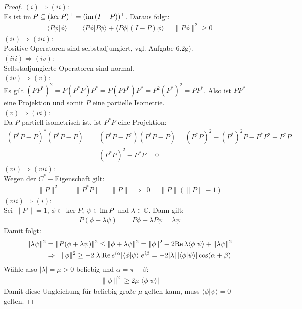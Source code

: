 \documentclass[a4paper,12pt]{article}
\newcommand{\brak}{}
\newcommand{\tecxt}{}
\begin{document}
\begin{proof}
$(i)\Rightarrow(ii)$:\\
Es ist im\,$P\subseteq (\ker P)^\bot=(\tecxt\text{im\,}(I-P))^\bot$. Daraus folgt:
\begin{align*}
\brak\langle {P\phi}| {\phi}\rangle&=\brak\langle {P\phi}| {P\phi}\rangle+\brak\langle {P\phi}| {(I-P)\phi}\rangle=\|P\phi\|^2\ge 0
\end{align*}
$(ii)\Rightarrow(iii)$:\\
Positive Operatoren sind selbstadjungiert, vgl. Aufgabe 6.2g).\\
$(iii)\Rightarrow(iv)$:\\
Selbstadjungierte Operatoren sind normal.\\
$(iv)\Rightarrow(v)$:\\
Es gilt $(PP^\ast)^2=P(P^\ast P)P^\ast =P(P P^\ast)P^\ast =P^2(P^\ast)^2=PP^\ast$. Also ist $PP^\ast$ eine Projektion und somit $P$ eine partielle Isometrie. \\
$(v)\Rightarrow(vi)$:\\
Da $P$ partiell isometrisch ist, ist $P^\ast P$ eine Projektion:
\begin{align*}
(P^\ast P-P)^\ast (P^\ast P-P)&=(P^\ast P-P^\ast)(P^\ast P-P)=(P^\ast P)^2-(P^\ast)^2P-P^\ast P^2+P^\ast P=\\
&=(P^\ast P)^2-P^\ast P=0
\end{align*}
$(vi)\Rightarrow(vii)$:\\
Wegen der $C^\ast -$Eigenschaft gilt:
\begin{align*}
\|P\|^2&=\|P^\ast P\|=\|P\|\ \ \Rightarrow\ \ 0=\|P\|(\|P\|-1)
\end{align*}
$(vii)\Rightarrow(i)$:\\
Sei $\|P\|=1$, $\phi\in\ker P$, $\psi\in\tecxt\text{im\,}P$ und $\lambda\in\mathbb{C}$. Dann gilt:
\begin{align*}
P(\phi+\lambda\psi)&=P\phi+\lambda P\psi=\lambda\psi
\end{align*}
Damit folgt:
\begin{align*}
\|\lambda\psi\|^2&=\|P(\phi+\lambda\psi)\|^2\le \|\phi+\lambda\psi\|^2=\|\phi\|^2+2\tecxt\text{Re\,}\lambda\brak\langle {\phi}| {\psi}\rangle+\|\lambda\psi\|^2\\
&\Rightarrow\ \ \|\phi\|^2\ge -2|\lambda|\tecxt\text{Re\,}e^{i\alpha}|\brak\langle {\phi}| {\psi}\rangle|e^{i\beta}=-2|\lambda|\,|\brak\langle {\phi}| {\psi}\rangle|\cos(\alpha+\beta)
\end{align*}
Wähle also $|\lambda|=\mu >0$ beliebig und $\alpha=\pi-\beta$:
\begin{align*}
\|\phi\|^2\ge 2\mu |\brak\langle {\phi}| {\psi}\rangle|
\end{align*}
Damit diese Ungleichung für beliebig große $\mu$ gelten kann, muss $\brak\langle {\phi}| {\psi}\rangle=0$ gelten.
\end{proof}
\end{document}
